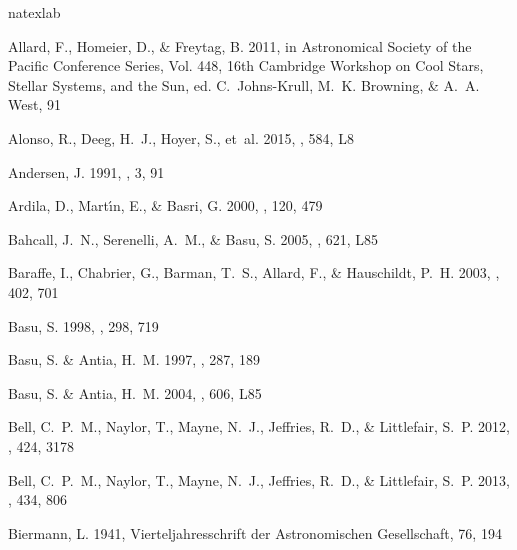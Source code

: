 \documentclass{aa}
\begin{document}
\begin{thebibliography}{71}
\expandafter\ifx\csname natexlab\endcsname\relax\def\natexlab#1{#1}\fi

{Allard}, F., {Homeier}, D., \& {Freytag}, B. 2011, in Astronomical Society of
  the Pacific Conference Series, Vol. 448, 16th Cambridge Workshop on Cool
  Stars, Stellar Systems, and the Sun, ed. C.~{Johns-Krull}, M.~K. {Browning},
  \& A.~A. {West}, 91

{Alonso}, R., {Deeg}, H.~J., {Hoyer}, S., {et~al.} 2015, \aap, 584, L8

{Andersen}, J. 1991, \aapr, 3, 91

{Ardila}, D., {Mart{\'{\i}}n}, E., \& {Basri}, G. 2000, \aj, 120, 479

{Bahcall}, J.~N., {Serenelli}, A.~M., \& {Basu}, S. 2005, \apj, 621, L85

{Baraffe}, I., {Chabrier}, G., {Barman}, T.~S., {Allard}, F., \& {Hauschildt},
  P.~H. 2003, \aap, 402, 701

{Basu}, S. 1998, \mnras, 298, 719

{Basu}, S. \& {Antia}, H.~M. 1997, \mnras, 287, 189

{Basu}, S. \& {Antia}, H.~M. 2004, \apjl, 606, L85

{Bell}, C.~P.~M., {Naylor}, T., {Mayne}, N.~J., {Jeffries}, R.~D., \&
  {Littlefair}, S.~P. 2012, \mnras, 424, 3178

{Bell}, C.~P.~M., {Naylor}, T., {Mayne}, N.~J., {Jeffries}, R.~D., \&
  {Littlefair}, S.~P. 2013, \mnras, 434, 806

{Biermann}, L. 1941, Vierteljahresschrift der Astronomischen Gesellschaft, 76,
  194


\end{thebibliography}
\end{document}
